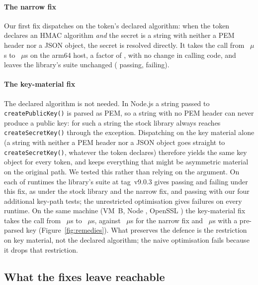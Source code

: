 \documentclass[preprint,12pt,authoryear]{elsarticle}
\newcommand{\LibraryTag}{tag~v9.0.3}
\begin{document}
\paragraph{The narrow fix} Our first fix dispatches on the token's declared
algorithm: when the token declares an HMAC algorithm \emph{and} the secret is a
string with neither a PEM header nor a JSON object, the secret is resolved
directly. It takes the call from \HostJwtString~$\mu$s to
\HostJwtStringSafe~$\mu$s on the arm64 host, a factor of \HostSafePatchRatio,
with no change in calling code, and leaves the library's suite unchanged
(\SuitePatchedPassing{} passing, \SuitePatchedFailing{} failing).

\paragraph{The key-material fix} The declared algorithm is not needed. In
Node.js a string passed to \texttt{createPublicKey()} is parsed as PEM, so a
string with no PEM header can never produce a public key: for such a string the
stock library always reaches \texttt{createSecretKey()} through the exception.
Dispatching on the key material alone (a string with neither a PEM header nor a
JSON object goes straight to \texttt{createSecretKey()}, whatever the token
declares) therefore yields the same key object for every token, and keeps
everything that might be asymmetric material on the original path. We tested
this rather than relying on the argument. On each of \SuiteVariantRuntimes{}
runtimes the library's suite at \LibraryTag{} gives \SuiteVarKeyonlyPassing{}
passing and \SuiteVarKeyonlyFailing{} failing under this fix, as under the stock
library and the narrow fix, and \SuiteVarKeyonlyPlusPassing{} passing with our
four additional key-path tests; the unrestricted optimisation gives
\SuiteVarNaiveFailing{} failures on every runtime. On the same machine (VM~B,
Node \VmbNode, OpenSSL \VmbOpenssl) the key-material fix takes the call from
\VmbJwtString~$\mu$s to \VmbJwtStringKeyonly~$\mu$s, against
\VmbJwtStringSafe~$\mu$s for the narrow fix and \VmbJwtPreparsed~$\mu$s with a
pre-parsed key (Figure~\ref{fig:remedies}). What preserves the defence is the
restriction on key material, not the declared algorithm; the naive
optimisation fails because it drops that restriction.

\subsection{What the fixes leave reachable}\label{sec:reachable}
\end{document}
